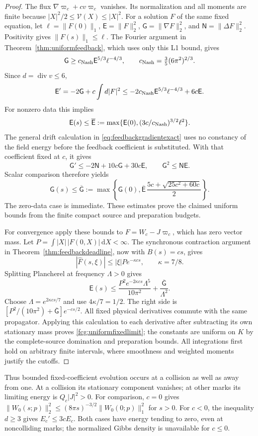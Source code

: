 \documentclass[11pt]{article}
\numberwithin{equation}{section}
\newcommand{\dd}{\,\mathrm d}
\begin{document}
\begin{proof}
The flux $\nabla\varpi_c+cv\varpi_c$ vanishes. Its normalization
and all moments are finite because
$|X|^2/2\le\mathcal V(X)\le|X|^2$.
For a solution $F$ of the same fixed equation, let
$\ell=\|F(0)\|_1$, $\mathsf E=\|F\|_2^2$,
$\mathsf G=\|\nabla F\|_2^2$, and
$\mathsf N=\|\Delta F\|_2^2$. Positivity gives
$\|F(s)\|_1\le\ell$. The Fourier argument in
Theorem~\ref{thm:uniformfeedback}, which uses only this L1 bound, gives
\[
 \mathsf G\ge c_{\rm Nash}\mathsf E^{5/3}\ell^{-4/3},
 \qquad c_{\rm Nash}=\tfrac35(6\pi^2)^{2/3}.
\]
Since $d=\operatorname{div}v\le6$,
\[
 \mathsf E'=-2\mathsf G+c\int d|F|^2
 \le-2c_{\rm Nash}\mathsf E^{5/3}\ell^{-4/3}+6c\mathsf E.
\]
For nonzero data this implies
\[
 \mathsf E(s)\le\overline{\mathsf E}:=
 \max\{\mathsf E(0),(3c/c_{\rm Nash})^{3/2}\ell^2\}.
\]
The general drift calculation in
\eqref{eq:feedbackgradientexact} uses no constancy of the field energy
before the feedback coefficient is substituted. With that coefficient
fixed at $c$, it gives
\[
 \mathsf G'\le-2\mathsf N+10c\mathsf G+30c\mathsf E,\qquad
 \mathsf G^2\le\mathsf N\mathsf E.
\]
Scalar comparison therefore yields
\[
 \mathsf G(s)\le\overline{\mathsf G}:=
 \max\left\{\mathsf G(0),
 \overline{\mathsf E}\,
       \frac{5c+\sqrt{25c^2+60c}}2\right\}.
\]
The zero-data case is immediate. These estimates prove the claimed
uniform bounds from the finite compact source and preparation budgets.

For convergence apply these bounds to
$F=W_c-J\varpi_c$, which has zero vector mass. Let
$P=\int|X|\,|F(0,X)|\dd X<\infty$. The synchronous contraction
argument in Theorem~\ref{thm:feedbackdeadline}, now with $B(s)=cs$,
gives
\[
 |\widehat F(s,\xi)|\le|\xi|P e^{-\kappa cs},\qquad \kappa=7/8.
\]
Splitting Plancherel at frequency $\Lambda>0$ gives
\[
 \mathsf E(s)\le
 \frac{P^2e^{-2\kappa cs}\Lambda^5}{10\pi^2}
                         +\frac{\overline{\mathsf G}}{\Lambda^2}.
\]
Choose $\Lambda=e^{2\kappa cs/7}$ and use $4\kappa/7=1/2$.
The right side is
$[P^2/(10\pi^2)+\overline{\mathsf G}]e^{-cs/2}$.
All fixed physical derivatives commute with the same propagator.
Applying this calculation to each derivative after subtracting its own
stationary mass proves \eqref{fcg:uniformfixedlimit}; the constants
are uniform on $K$ by the complete-source domination and preparation
bounds. All integrations first hold on arbitrary finite intervals,
where smoothness and weighted moments justify the cutoffs.
\end{proof}

Thus bounded fixed-coefficient evolution occurs at a collision as well
as away from one. At a collision its stationary component vanishes;
at other marks its limiting energy is $Q_c|J|^2>0$.
For comparison, $c=0$ gives
$\|W_0(s;p)\|_2^2\le(8\pi s)^{-3/2}\|W_0(0;p)\|_1^2$ for $s>0$.
For $c<0$, the inequality $d\ge3$ gives
$E_c'\le3cE_c$. Both cases have energy tending to zero, even at
noncolliding marks; the normalized Gibbs density is unavailable for
$c\le0$.
\end{document}
